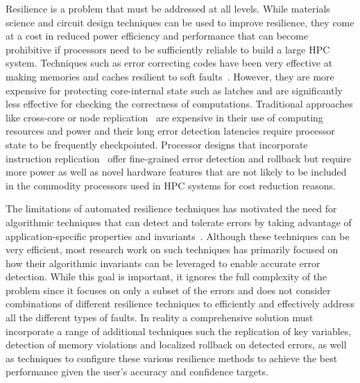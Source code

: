 \documentclass{sig-alternate}
\begin{document}
Resilience is a problem that must be addressed at all levels.
While materials science and circuit design techniques can be used to improve resilience, they come at a cost in reduced power efficiency and performance that can become prohibitive if processors need to be sufficiently reliable to build a large HPC system.
Techniques such as error correcting codes have been very effective at making memories and caches resilient to soft faults~\cite{mem_errors:2010}.
However, they are more expensive for protecting core-internal state such as latches and are significantly less effective for checking the correctness of computations.
Traditional approaches like cross-core or node replication~\cite{rmpi:2011, dyn_cmp_repl:2007} are expensive in their use of computing resources and power and their long error detection latencies require processor state to be frequently checkpointed.
Processor designs that incorporate instruction replication~\cite{repl_smt:2000} offer fine-grained error detection and rollback but require more power as well as novel hardware features that are not likely to be included in the commodity processors used in HPC systems for cost reduction reasons.

The limitations of automated resilience techniques has motivated the need for algorithmic techniques that can detect and tolerate errors by taking advantage of application-specific properties and invariants~\cite{amg_abft:2012, robustification:2010, abft:1984}.
Although these techniques can be very efficient, most research work on such techniques has primarily focused on how their algorithmic invariants can be leveraged to enable accurate error detection.
While this goal is important, it ignores the full complexity of the problem since it focuses on only a subset of the errors and does not consider combinations of different resilience techniques to efficiently and effectively address all the different types of faults.
In reality a comprehensive solution must incorporate a range of additional techniques such the replication of key variables, detection of memory violations and localized rollback on detected errors, as well as techniques to configure these various resilience methods to achieve the best performance given the user's accuracy and confidence targets.
\end{document}
